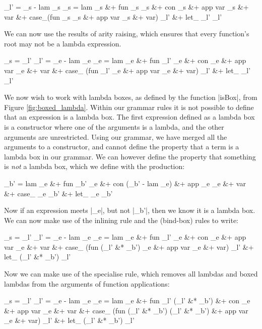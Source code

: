 \documentclass[preprint]{sigplanconf}
\begin{document}
\ignore\begin{code}
_l'  =  _s - lam _s
_s   =  lam _s &+ fun _s _s &+ con _s &+ app var _s &+ var &+
        case_(fun _s _s &+ app var _s &+ var) _l' &+ let_ _l' _l'
\end{code}

We can now use the results of arity raising, which ensures that every function's root may not be a lambda expression.

\ignore\begin{code}
_s   = _l'
_l' = _e - lam _e
_e =  lam _e &+ fun _l' _e &+ con _e &+ app var _e &+ var &+
      case_ (fun _l' _e &+ app var _e &+ var) _l' &+ let_ _l' _l'
\end{code}

We now wish to work with lambda boxes, as defined by the function |isBox|, from Figure \ref{fig:boxed_lambda}. Within our grammar rules it is not possible to define that an expression is a lambda box. The first expression defined as a lambda box is a constructor where one of the arguments is a lambda, and the other arguments are unrestricted. Using our grammar, we have merged all the arguments to a constructor, and cannot define the property that a term is a lambda box in our grammar. We can however define the property that something is \textit{not} a lambda box, which we define with the production:

%
\ignore\begin{code}
_b'  =  lam _e &+ fun _b' _e &+ con (_b' - lam _e) &+ app _e _e &+ var &+
        case_ _e _b' &+ let_ _e _b'
\end{code}

Now if an expression meets |_e|, but not |_b'|, then we know it is a lambda box. We can now make use of the inlining rule and the (bind-box) rules to write:

\ignore\begin{code}
_s   = _l'
_l' = _e - lam _e
_e =  lam _e &+ fun _l' _e &+ con _e &+ app var _e &+ var &+
      case_ (fun (_l' &* _b') _e &+ app var _e &+ var) _l' &+ let_ (_l' &* _b') _l'
\end{code}

Now we can make use of the specialise rule, which removes all lambdas and boxed lambdas from the arguments of function applications:

\ignore\begin{code}
_s   = _l'
_l' = _e - lam _e
_e =  lam _e &+ fun _l' (_l' &* _b') &+ con _e &+ app var _e &+ var &+
      case_ (fun (_l' &* _b') (_l' &* _b') &+ app var _e &+ var) _l' &+
      let_ (_l' &* _b') _l'
\end{code}
\end{document}
